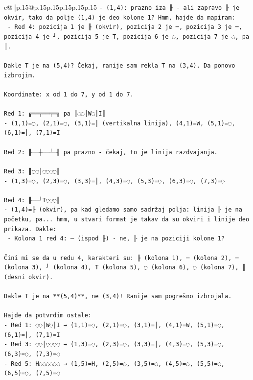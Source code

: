 \documentclass{article}
\begin{document}
{\begin{supertabular}{c@{$\;$}|p{.15\linewidth}@{}p{.15\linewidth}p{.15\linewidth}p{.15\linewidth}p{.15\linewidth}p{.15\linewidth}}
{{{\texttt{{-} (1,4): prazno iza ╟ {-} ali zapravo ╟ je okvir, tako da polje (1,4) je deo kolone 1? Hmm, hajde da mapiram:} \\
\texttt{  {-} Red 4: pozicija 1 je ╟ (okvir), pozicija 2 je ─, pozicija 3 je ─, pozicija 4 je ┘, pozicija 5 je T, pozicija 6 je ◌, pozicija 7 je ◌, pa ║.} \\
\\ 
\texttt{Dakle T je na (5,4)? Čekaj, ranije sam rekla T na (3,4). Da ponovo izbrojim.} \\
\\ 
\texttt{Koordinate: x od 1 do 7, y od 1 do 7.} \\
\\ 
\texttt{Red 1: ╔══╤══╤═╗ pa ║◌◌│W◌│I║} \\
\texttt{{-} (1,1)=◌, (2,1)=◌, (3,1)=│ (vertikalna linija), (4,1)=W, (5,1)=◌, (6,1)=│, (7,1)=I} \\
\\ 
\texttt{Red 2: ╟──┼──┴─╢ pa prazno {-} čekaj, to je linija razdvajanja.} \\
\\ 
\texttt{Red 3: ║◌◌│◌◌◌◌║} \\
\texttt{{-} (1,3)=◌, (2,3)=◌, (3,3)=│, (4,3)=◌, (5,3)=◌, (6,3)=◌, (7,3)=◌} \\
\\ 
\texttt{Red 4: ╟──┘T◌◌◌║} \\
\texttt{{-} (1,4)=╟ (okvir), pa kad gledamo samo sadržaj polja: linija ╟ je na početku, pa... hmm, u stvari format je takav da su okviri i linije deo prikaza. Dakle:} \\
\texttt{  {-} Kolona 1 red 4: ─ (ispod ╟) {-} ne, ╟ je na poziciji kolone 1? } \\
\\ 
\texttt{Čini mi se da u redu 4, karakteri su: ╟ (kolona 1), ─ (kolona 2), ─ (kolona 3), ┘ (kolona 4), T (kolona 5), ◌ (kolona 6), ◌ (kolona 7), ║ (desni okvir).} \\
\\ 
\texttt{Dakle T je na **(5,4)**, ne (3,4)! Ranije sam pogrešno izbrojala.} \\
\\ 
\texttt{Hajde da potvrdim ostale:} \\
\texttt{{-} Red 1: ◌◌│W◌│I → (1,1)=◌, (2,1)=◌, (3,1)=│, (4,1)=W, (5,1)=◌, (6,1)=│, (7,1)=I} \\
\texttt{{-} Red 3: ◌◌│◌◌◌◌ → (1,3)=◌, (2,3)=◌, (3,3)=│, (4,3)=◌, (5,3)=◌, (6,3)=◌, (7,3)=◌} \\
\texttt{{-} Red 5: H◌◌◌◌◌◌ → (1,5)=H, (2,5)=◌, (3,5)=◌, (4,5)=◌, (5,5)=◌, (6,5)=◌, (7,5)=◌} \\
}}}
\end{supertabular}}
\end{document}
